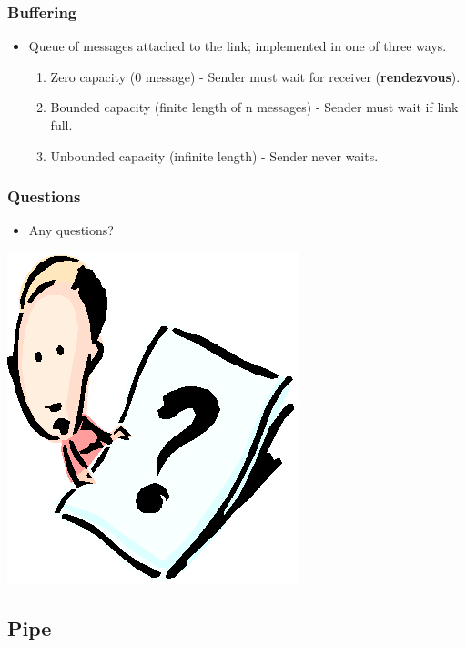 \documentclass[CJKutf8,xcolor=pdftex,dvipsnames,table]{beamer}
\begin{document}
\begin{CJK*}{UTF8}{song}
  \begin{frame}
  \frametitle{Buffering} \pause
  \begin{itemize}
  \item{Queue of messages attached to the link; implemented in one of three ways.} \pause
    \begin{enumerate}
    \item{Zero capacity (0 message) \pause - Sender must wait for receiver (\textbf{rendezvous}).} \pause
    \item{Bounded capacity (finite length of n messages) \pause - Sender must wait if link full.} \pause
    \item{Unbounded capacity (infinite length) \pause - Sender never waits.}
    \end{enumerate}
  \end{itemize}
  \end{frame}

  \begin{frame}
  \frametitle{Questions}
  \begin{itemize}
  \item{Any questions?}
  \end{itemize}
  \begin{center}
    \includegraphics[scale=.5]{question}
  \end{center}
  \end{frame}

  \fi

  \subsection{Pipe}


\end{CJK*}
\end{document}
